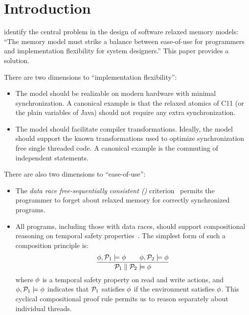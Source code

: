 
\section{Introduction}
\citet{Manson:2005:JMM:1047659.1040336} identify the central problem in the design of software relaxed memory models: ``The memory model must strike a balance between ease-of-use for programmers and implementation flexibility for system designers.''   This paper provides a solution.


There are two dimensions to ``implementation flexibility'':
\begin{itemize}
\item The model should be realizable on modern hardware with minimal synchronization.  A canonical example is that the relaxed atomics of C11 (or the plain variables of Java) should not require any extra synchronization.

\item The  model should facilitate compiler transformations.    Ideally, the model should support the known transformations used to optimize  synchronization free single threaded code.  A canonical example is the  commuting of independent statements.
\end{itemize}

There are also two dimensions to ``ease-of-use'':
\begin{itemize}
\item The \emph{data race free-sequentially consistent (\drfsc)} criterion~\cite{DBLP:journals/tpds/AdveH93, DBLP:conf/isca/AdveH90} permits the programmer to forget about relaxed memory for correctly synchronized programs.  

\item All programs, including those with data races,  should support compositional reasoning on temporal safety properties~\cite{PnueliSafety,Misra:1981:PNP:1313338.1313770,StarkSafety,Abadi:1993:CS:151646.151649}.  The simplest form of such a composition principle is:
\[
  \frac{
      \phi, \mathcal{P}_1 \models\phi
      \qquad
      \phi, \mathcal{P}_2 \models\phi
    }{\mathcal{P}_1 \parallel \mathcal{P}_2 \models \phi}
\]
where $\phi$ is a temporal safety property on read and write actions, and $\phi, \mathcal{P}_1 \models\phi$ indicates that $\mathcal{P}_1$ satisfies $\phi$ if the environment satisfies $\phi$.  This cyclical compositional proof rule permits us to reason separately about individual threads. 
\end{itemize}

